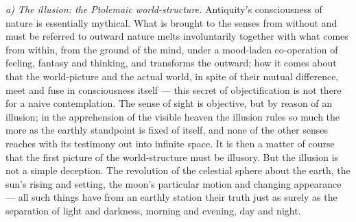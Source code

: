 \documentclass[12pt,a4paper]{book}
\newcommand{\runin}[1]{\emph{#1}\hspace{0.4em}}
\begin{document}
\runin{a) The illusion: the Ptolemaic world-structure.} Antiquity's consciousness of nature is
essentially mythical. What is brought to the senses from without and must be referred to outward
nature melts involuntarily together with what comes from within, from the ground of the mind, under a
mood-laden co-operation of feeling, fantasy and thinking, and transforms the outward; how it comes
about that the world-picture and the actual world, in spite of their mutual difference, meet and fuse
in consciousness itself --- this secret of objectification is not there for a naive contemplation. The
sense of sight is objective, but by reason of an illusion; in the apprehension of the visible heaven
the illusion rules so much the more as the earthly standpoint is fixed of itself, and none of the
other senses reaches with its testimony out into infinite space. It is then a matter of course that
the first picture of the world-structure must be illusory. But the illusion is not a simple deception.
The revolution of the celestial sphere about the earth, the sun's rising and setting, the moon's
particular motion and changing appearance --- all such things have from an earthly station their truth
just as surely as
the separation of light and darkness, morning and evening, day and night.
\end{document}
